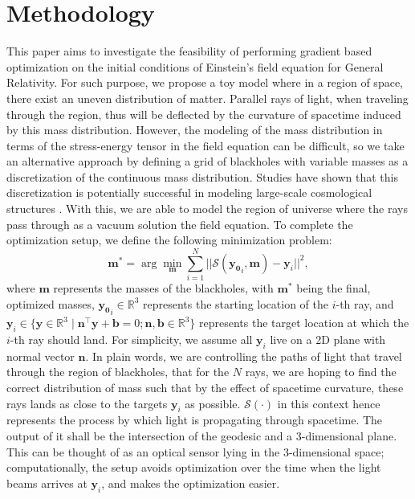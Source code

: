\documentclass[conference]{IEEEtran}
\begin{document}
\section{Methodology}
This paper aims to investigate the feasibility of performing gradient 
based optimization on the initial conditions of Einstein’s field 
equation for General Relativity. For such purpose, we propose a toy 
model where in a region of space, there exist an uneven distribution 
of matter. Parallel rays of light, when traveling through the region, 
thus will be deflected by the curvature of spacetime induced by this 
mass distribution. However, the modeling of the mass distribution in terms 
of the stress-energy tensor in the field equation can be difficult, so we 
take an alternative approach by defining a grid of blackholes with 
variable masses as a discretization of the continuous mass distribution. 
Studies have shown that this discretization is potentially 
successful in modeling large-scale cosmological structures \cite{BHlattice}. 
With this, we are able to model 
the region of universe where the rays pass through as a vacuum  solution the 
field equation. To complete the optimization setup, we define the 
following minimization problem:
\[
\mathbf{m^*} = 
\arg \min_{\mathbf{m}} \sum_{i=1}^{N}|| \mathcal{S}(\mathbf{y_0}_i, \mathbf{m}) - \mathbf{y}_i||^2,
\tag{6}
\]
where $\mathbf{m}$ represents the masses of the blackholes, with $\mathbf{m^*}$ being 
the final, optimized masses, $\mathbf{y_0}_i \in \mathbb{R}^3$ represents the starting location of 
the $i$-th ray, and 
$\mathbf{y}_i \in \{ \mathbf{y} \in \mathbb{R}^3 \mid \mathbf{n}^\top \mathbf{y} + \mathbf{b} = 0; \mathbf{n}, \mathbf{b}\in \mathbb{R}^3\}$ represents the target location at which the $i$-th ray 
should land. For simplicity, we assume all $\mathbf{y}_i$ live on a 2D plane with 
normal vector $\mathbf{n}$.
In plain words, we are controlling the paths of light that 
travel through the region of blackholes, that for the $N$ rays, 
we are hoping to find the correct distribution of mass such that by 
the effect of spacetime curvature, these rays lands as close to the targets 
$\mathbf{y}_i$ as possible. $\mathcal{S}(\cdot)$ in this context 
hence represents the process by which light is propagating through 
spacetime. The output of it shall be the intersection of the geodesic and a 3-dimensional 
plane. This can be thought of as an optical sensor lying in the 3-dimensional space; 
computationally, the setup avoids optimization over the time when the light beams  
arrives at $\mathbf{y}_i$, and makes the optimization easier.
\end{document}
